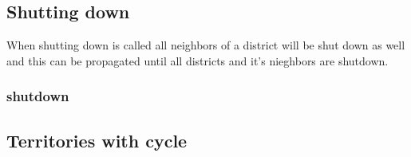 \documentclass[11pt,a4paper]{article}
\begin{document}
\subsection{Shutting down}
When shutting down is called all neighbors of a district will be shut down as well and this can be propagated until all districts and it's nieghbors are shutdown.

\subsubsection{shutdown}

\subsection{Territories with cycle}



\end{document}
